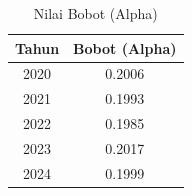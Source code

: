 \begin{table}[H]
\centering
\caption{Nilai Bobot (Alpha)} \label{tab:alpha}
\begin{tabular}{|c|c|}
\hline
\textbf{Tahun} & \textbf{Bobot (Alpha)} \\
\hline
2020 & 0.2006 \\
2021 & 0.1993 \\
2022 & 0.1985 \\
2023 & 0.2017 \\
2024 & 0.1999 \\
\hline
\end{tabular}
\end{table}
